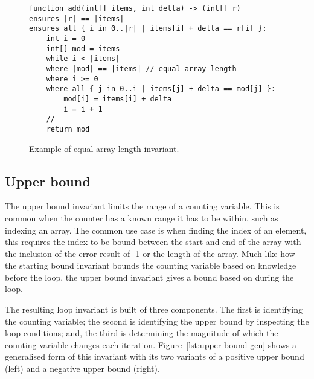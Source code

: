 \begin{figure}[ht]
\begin{lstlisting}
function add(int[] items, int delta) -> (int[] r)
ensures |r| == |items|
ensures all { i in 0..|r| | items[i] + delta == r[i] }:
    int i = 0
    int[] mod = items
    while i < |items|
    where |mod| == |items| // equal array length
    where i >= 0
    where all { j in 0..i | items[j] + delta == mod[j] }:
        mod[i] = items[i] + delta
        i = i + 1
    //
    return mod
\end{lstlisting}
\caption{Example of equal array length invariant.}
\label{lst:array-length-eq}
\end{figure}

\subsection{Upper bound}\label{s:design-upper-bound}

The upper bound invariant limits the range of a counting variable.
This is common when the counter has a known range it has to be within,
such as indexing an array.
The common use case is when finding the index of an element,
this requires the index to be bound between the start and end of the
array with the inclusion of the error result of -1 or the length of the array.
Much like how the starting bound invariant bounds
the counting variable based on knowledge before the loop,
the upper bound invariant gives a bound based on during the loop.

The resulting loop invariant is built of three components.
The first is identifying the counting variable; 
the second is identifying the upper bound by inspecting the
loop conditions; and, the third is determining the 
magnitude of which the counting variable changes each iteration.
Figure~\ref{lst:upper-bound-gen} shows a generalised form
of this invariant with its two variants of a positive 
upper bound (left) and a negative upper bound (right).

